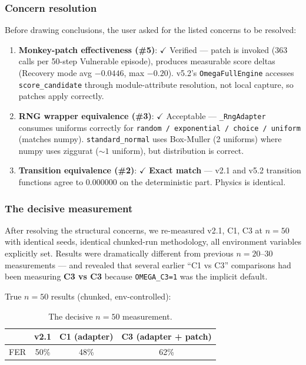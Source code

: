 \subsubsection{Concern resolution}

Before drawing conclusions, the user asked for the listed concerns
to be resolved:

\begin{enumerate}
\item \textbf{Monkey-patch effectiveness (\#5)}: $\checkmark$
Verified --- patch is invoked (363 calls per 50-step Vulnerable
episode), produces measurable score deltas (Recovery mode avg
$-0.0446$, max $-0.20$). v5.2's \texttt{OmegaFullEngine} accesses
\texttt{score\_candidate} through module-attribute resolution, not
local capture, so patches apply correctly.
\item \textbf{RNG wrapper equivalence (\#3)}: $\checkmark$
Acceptable --- \texttt{\_RngAdapter} consumes uniforms correctly for
\texttt{random / exponential / choice / uniform} (matches numpy).
\texttt{standard\_normal} uses Box-Muller (2 uniforms) where numpy
uses ziggurat ($\sim 1$ uniform), but distribution is correct.
\item \textbf{Transition equivalence (\#2)}: $\checkmark$
\textbf{Exact match} --- v2.1 and v5.2 transition functions agree to
0.000000 on the deterministic part. Physics is identical.
\end{enumerate}

\subsubsection{The decisive measurement}

After resolving the structural concerns, we re-measured v2.1, C1, C3
at $n = 50$ with identical seeds, identical chunked-run methodology,
all environment variables explicitly set. Results were dramatically
different from previous $n = 20$--30 measurements --- and revealed
that several earlier ``C1 vs C3'' comparisons had been measuring
\textbf{C3 vs C3} because \texttt{OMEGA\_C3=1} was the implicit
default.

True $n = 50$ results (chunked, env-controlled):

\begin{table}[ht]
\centering
\small
\begin{tabularx}{\linewidth}{Xccc}
\toprule
& \textbf{v2.1} & \textbf{C1 (adapter)} &
\textbf{C3 (adapter + patch)} \\
\midrule
FER & 50\% & 48\% & 62\% \\
\bottomrule
\end{tabularx}
\caption[v2.5 decisive measurement]{The decisive $n = 50$
measurement.}
\label{tab:methodology-v25-decisive}
\end{table}

